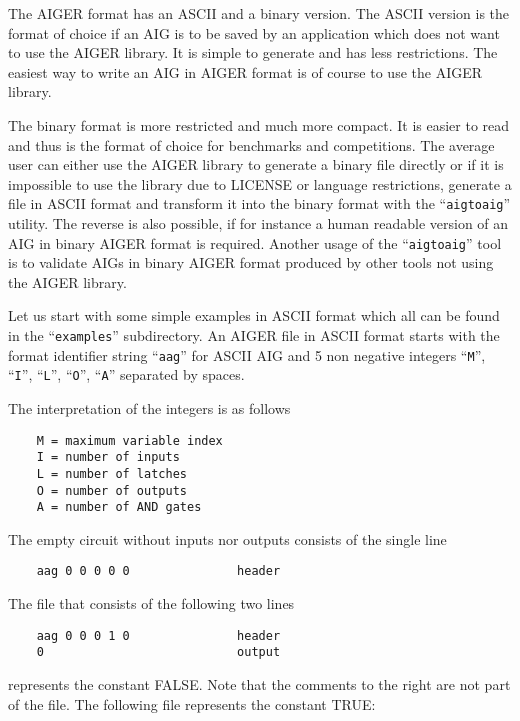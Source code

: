 \documentclass{llncs}
\begin{document}
  The AIGER format has an ASCII and a binary version.  The ASCII version is
  the format of choice if an AIG is to be saved by an application which
  does not want to use the AIGER library.  It is simple to generate and has
  less restrictions.  The easiest way to write an AIG in AIGER format is of
  course to use the AIGER library.
  
  The binary format is more restricted and much more compact.  It is easier
  to read and thus is the format of choice for benchmarks and competitions.
  The average user can either use the AIGER library to generate a binary
  file directly or if it is impossible to use the library due to LICENSE or
  language restrictions, generate a file in ASCII format and transform
  it into the binary format with the ``\texttt{aigtoaig}'' utility.
  The reverse is also
  possible, if for instance a human readable version of an AIG in binary
  AIGER format is required.  Another usage of the ``\texttt{aigtoaig}'' tool is to
  validate AIGs in binary AIGER format produced by other tools not using
  the AIGER library.

  Let us start with some simple examples in ASCII format which all can be
  found in the ``\texttt{examples}'' subdirectory.  An AIGER file in ASCII format
  starts with the format identifier string ``\texttt{aag}'' for ASCII AIG and 5 non
  negative integers ``\texttt{M}'', ``\texttt{I}'', ``\texttt{L}'', ``\texttt{O}'',
  ``\texttt{A}'' separated by spaces.

  The interpretation of the integers is as follows

\begin{verbatim}
    M = maximum variable index
    I = number of inputs
    L = number of latches
    O = number of outputs
    A = number of AND gates
\end{verbatim}

  The empty circuit without inputs nor outputs consists of the single line

\begin{verbatim}
    aag 0 0 0 0 0               header
\end{verbatim}
  
  The file that consists of the following two lines

\begin{verbatim}
    aag 0 0 0 1 0               header
    0                           output
\end{verbatim}

  represents the constant FALSE.  Note that the comments to the right are
  not part of the file.  The following file represents the constant TRUE:
    
\end{document}
